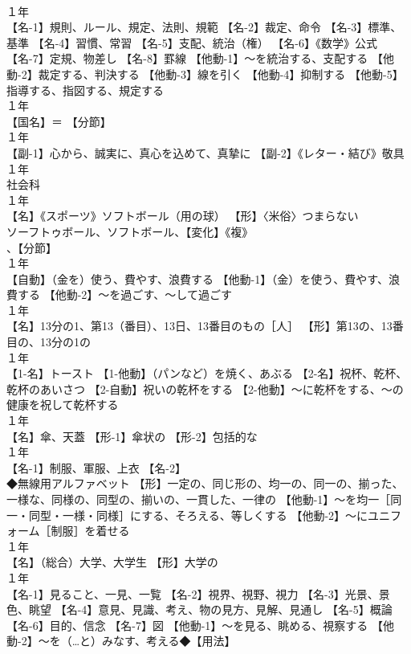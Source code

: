 \documentclass[8pt]{extreport}
\begin{document}
\begin{CJK}{UTF8}{min}
\\	１年	
\\	【名-1】規則、ルール、規定、法則、規範 【名-2】裁定、命令 【名-3】標準、基準 【名-4】習慣、常習 【名-5】支配、統治（権） 【名-6】《数学》公式 【名-7】定規、物差し 【名-8】罫線 【他動-1】～を統治する、支配する 【他動-2】裁定する、判決する 【他動-3】線を引く 【他動-4】抑制する 【他動-5】指導する、指図する、規定する
\\	１年	
\\	【国名】＝ 【分節】
\\	１年	
\\	【副-1】心から、誠実に、真心を込めて、真摯に 【副-2】《レター・結び》敬具
\\	１年	
\\	社会科
\\	１年	
\\	【名】《スポーツ》ソフトボール（用の球） 【形】〈米俗〉つまらない 
\\	ソーフトゥボール、ソフトボール、【変化】《複》
\\	、【分節】
\\	１年	
\\	【自動】（金を）使う、費やす、浪費する 【他動-1】（金）を使う、費やす、浪費する 【他動-2】～を過ごす、～して過ごす
\\	１年	
\\	【名】13分の1、第13（番目）、13日、13番目のもの［人］ 【形】第13の、13番目の、13分の1の
\\	１年	
\\	【1-名】トースト 【1-他動】（パンなど）を焼く、あぶる 【2-名】祝杯、乾杯、乾杯のあいさつ 【2-自動】祝いの乾杯をする 【2-他動】～に乾杯をする、～の健康を祝して乾杯する
\\	１年	
\\	【名】傘、天蓋 【形-1】傘状の 【形-2】包括的な
\\	１年	
\\	【名-1】制服、軍服、上衣 【名-2】
\\	◆無線用アルファベット 【形】一定の、同じ形の、均一の、同一の、揃った、一様な、同様の、同型の、揃いの、一貫した、一律の 【他動-1】～を均一［同一・同型・一様・同様］にする、そろえる、等しくする 【他動-2】～にユニフォーム［制服］を着せる
\\	１年	
\\	【名】（総合）大学、大学生 【形】大学の
\\	１年	
\\	【名-1】見ること、一見、一覧 【名-2】視界、視野、視力 【名-3】光景、景色、眺望 【名-4】意見、見識、考え、物の見方、見解、見通し 【名-5】概論 【名-6】目的、信念 【名-7】図 【他動-1】～を見る、眺める、視察する 【他動-2】～を（…と）みなす、考える◆【用法】

\end{CJK}
\end{document}
